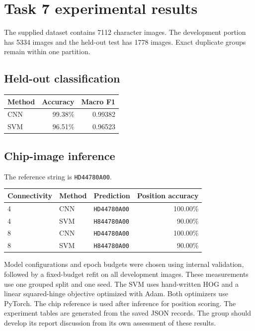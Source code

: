 \section{Task 7 experimental results}
The supplied dataset contains 7112 character images. The development portion has 5334 images and the held-out test has 1778 images. Exact duplicate groups remain within one partition.
\subsection{Held-out classification}
\begin{center}\begin{tabular}{lrr}\toprule
Method & Accuracy & Macro F1 \\\midrule
CNN & 99.38\% & 0.99382 \\
SVM & 96.51\% & 0.96523 \\
\bottomrule\end{tabular}\end{center}
\subsection{Chip-image inference}
The reference string is \texttt{HD44780A00}.
\begin{center}\begin{tabular}{lllr}\toprule
Connectivity & Method & Prediction & Position accuracy \\\midrule
4 & CNN & \texttt{HD44780A00} & 100.00\% \\
4 & SVM & \texttt{H844780A00} & 90.00\% \\
8 & CNN & \texttt{HD44780A00} & 100.00\% \\
8 & SVM & \texttt{H844780A00} & 90.00\% \\
\bottomrule\end{tabular}\end{center}
Model configurations and epoch budgets were chosen using internal validation, followed by a fixed-budget refit on all development images. These measurements use one grouped split and one seed. The SVM uses hand-written HOG and a linear squared-hinge objective optimized with Adam. Both optimizers use PyTorch. The chip reference is used after inference for position scoring.
The experiment tables are generated from the saved JSON records. The group should develop its report discussion from its own assessment of these results.
